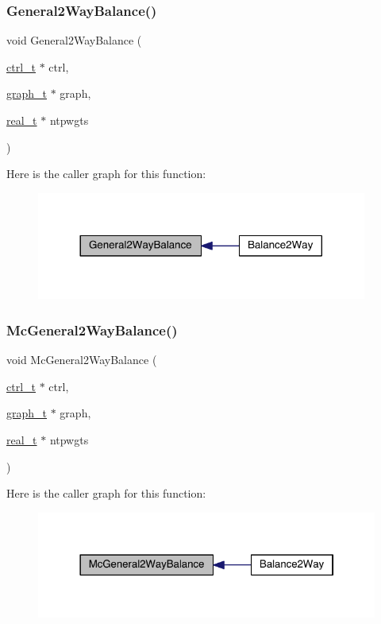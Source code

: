 \subsubsection{\texorpdfstring{General2\+Way\+Balance()}{General2WayBalance()}}
{\footnotesize\ttfamily void General2\+Way\+Balance (\begin{DoxyParamCaption}\item[{\hyperlink{a00742}{ctrl\+\_\+t} $\ast$}]{ctrl,  }\item[{\hyperlink{a00734}{graph\+\_\+t} $\ast$}]{graph,  }\item[{\hyperlink{a00876_a1924a4f6907cc3833213aba1f07fcbe9}{real\+\_\+t} $\ast$}]{ntpwgts }\end{DoxyParamCaption})}

Here is the caller graph for this function\+:\nopagebreak
\begin{figure}[H]
\begin{center}
\leavevmode
\includegraphics[width=308pt]{a00173_a726f3ab2e1dbf55fcf3c6a31037542f5_icgraph}
\end{center}
\end{figure}
\mbox{\label{a00173_a765ccbdaa41401e55a2b6d350964f289}} 
\subsubsection{\texorpdfstring{Mc\+General2\+Way\+Balance()}{McGeneral2WayBalance()}}
{\footnotesize\ttfamily void Mc\+General2\+Way\+Balance (\begin{DoxyParamCaption}\item[{\hyperlink{a00742}{ctrl\+\_\+t} $\ast$}]{ctrl,  }\item[{\hyperlink{a00734}{graph\+\_\+t} $\ast$}]{graph,  }\item[{\hyperlink{a00876_a1924a4f6907cc3833213aba1f07fcbe9}{real\+\_\+t} $\ast$}]{ntpwgts }\end{DoxyParamCaption})}

Here is the caller graph for this function\+:\nopagebreak
\begin{figure}[H]
\begin{center}
\leavevmode
\includegraphics[width=322pt]{a00173_a765ccbdaa41401e55a2b6d350964f289_icgraph}
\end{center}
\end{figure}
